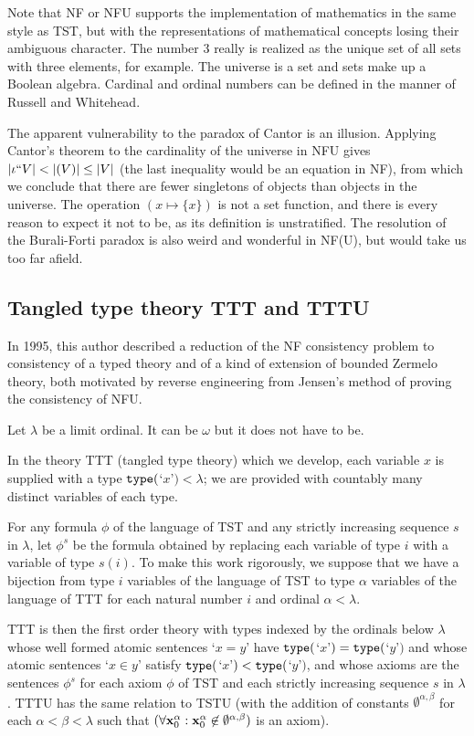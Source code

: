 \documentclass[12pt]{article}
\begin{document}
Note that NF or NFU supports the implementation of mathematics in the same style as TST, but with the representations of mathematical concepts losing their ambiguous character.  The number 3 really is realized as the unique set of all sets with three elements, for example.  The universe is a set and sets make up a Boolean algebra.   Cardinal and ordinal numbers can be defined
in the manner of Russell and Whitehead.

The apparent vulnerability to the paradox of Cantor is an illusion.  Applying Cantor's theorem to the cardinality of the universe in NFU gives $|\iota``V| < |{\cal }(V)| \leq |V|$ (the last inequality would be an equation in NF), from which we conclude that there are fewer singletons of objects than objects in the universe.  The operation $(x \mapsto \{x\})$ is not a set function, and there is every reason to expect it not to be, as its definition is unstratified.  The resolution of the Burali-Forti paradox is also weird and wonderful in NF(U), but would take us too far afield.

\newpage

\subsection{Tangled type theory TTT and TTTU}

In 1995, this author described a reduction of the NF consistency problem to consistency of a typed theory and of a kind of extension of bounded Zermelo theory, both motivated by reverse engineering from Jensen's method of proving the consistency of NFU.

Let $\lambda$ be a limit ordinal.  It can be $\omega$ but it does not have to be.  

In the theory TTT (tangled type theory) which we develop, each variable $x$ is supplied with a type ${\tt type}($`$x$'$) <\lambda$;  we are provided with countably many distinct variables of each type.

For any formula $\phi$ of the language of TST and any strictly increasing sequence $s$ in $\lambda$, let $\phi^s$ be the formula obtained by replacing each variable
of type $i$ with a variable of type $s(i)$.  To make this work rigorously, we suppose that we have a bijection from type $i$ variables of the language of TST to type $\alpha$ variables
of the language of TTT for each natural number $i$ and ordinal $\alpha<\lambda$.

TTT is then the first order theory with types indexed by the ordinals below $\lambda$ whose well formed atomic sentences `$x=y$' have ${\tt type}($`$x$'$) = {\tt type}($`$y$'$)$ and whose atomic sentences `$x \in y$' satisfy ${\tt type}($`$x$'$) < {\tt type}($`$y$'$)$, and whose axioms are the sentences $\phi^s$ for each axiom $\phi$ of TST and each strictly increasing sequence $s$ in $\lambda$.  TTTU has the same relation to TSTU (with the addition of constants $\emptyset^{\alpha,\beta}$ for each $\alpha<\beta<\lambda$  such that $(\forall {\bf x}_0^{\alpha} :{\bf x}_0^{\alpha}\not\in \emptyset^{\alpha,\beta})$ is an axiom).
\end{document}
